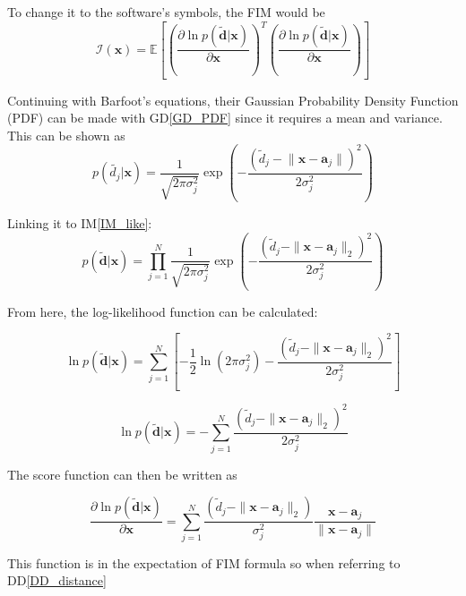 \documentclass[12pt]{article}
\newcommand{\dref}[1]{GD\ref{#1}}
\newcommand{\ddref}[1]{DD\ref{#1}}
\newcommand{\iref}[1]{IM\ref{#1}}
\begin{document}
To change it to the software's symbols, the FIM would be
\begin{displaymath}
  \boldsymbol{\mathcal{I}}(\mathbf{x}) = \mathbb{E} \left[
  \left( \frac{\partial \ln p(\mathbf{\tilde{d}} | \mathbf{x})}{\partial \mathbf{x}} \right)^{T}
  \left( \frac{\partial \ln p(\mathbf{\tilde{d}} | \mathbf{x})}{\partial \mathbf{x}} \right)
  \right]
\end{displaymath} 

Continuing with Barfoot's equations, their Gaussian Probability Density Function (PDF) can be made with \dref{GD_PDF} since it requires a mean and variance. This can be shown as
\begin{displaymath}
  p(\tilde{d_j} | \mathbf{x}) = \frac{1}{\sqrt{2\pi\sigma_j^2}} 
  \exp \left( 
  -\frac{(\tilde{d}_j - \lVert\mathbf{x} - \mathbf{a}_j\rVert)^2}{2\sigma_j^2} 
  \right)
\end{displaymath}

Linking it to \iref{IM_like}:
\begin{displaymath}
  p(\tilde{\mathbf{d}} | \mathbf{x}) = \prod_{j=1}^{N} 
  \frac{1}{\sqrt{2\pi\sigma_j^2}} 
  \exp \left( 
  -\frac{(\tilde{d}_j - \|\mathbf{x} - \mathbf{a}_j\|_2)^2}{2\sigma_j^2} 
  \right)
\end{displaymath}

From here, the log-likelihood function can be calculated:

\begin{displaymath}
  \ln p(\tilde{\mathbf{d}} | \mathbf{x}) = \sum_{j=1}^{N} 
  \left[ -\frac{1}{2} \ln (2\pi\sigma_j^2) 
  - \frac{(\tilde{d}_j - \|\mathbf{x} - \mathbf{a}_j\|_2)^2}{2\sigma_j^2} 
  \right]
\end{displaymath}

\begin{displaymath}
  \ln p(\tilde{\mathbf{d}} | \mathbf{x}) = -\sum_{j=1}^{N} 
  \frac{(\tilde{d}_j - \|\mathbf{x} - \mathbf{a}_j\|_2)^2}{2\sigma_j^2}
\end{displaymath}

The score function can then be written as

\begin{displaymath}
  \frac{\partial \ln p(\tilde{\mathbf{d}} | \mathbf{x})}{\partial \mathbf{x}} = \sum_{j=1}^{N} 
  \frac{(\tilde{d}_j - \|\mathbf{x} - \mathbf{a}_j\|_2)}{\sigma_j^2}
  \frac{\mathbf{x} - \mathbf{a}_j}{\|\mathbf{x} - \mathbf{a}_j\|}
\end{displaymath}

This function is in the expectation of FIM formula so when referring to \ddref{DD_distance} 
\end{document}
